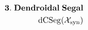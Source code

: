 \documentclass[preview]{standalone}
\begin{document}
\begin{align*}
\special{dvisvgm:raw <g id='unique000'>}\mathbf{3.\;Dendroidal\;Segal}\\\operatorname{dCSeg}(\mathcal{X}_{\text{syn}})\special{dvisvgm:raw </g>}
\end{align*}
\end{document}
